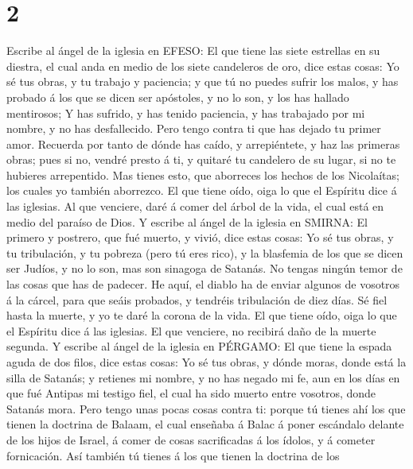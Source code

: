 \hypertarget{section-1}{%
\section{2}\label{section-1}}

 Escribe al ángel de la iglesia en EFESO: El que tiene las
siete estrellas en su diestra, el cual anda en medio de los siete
candeleros de oro, dice estas cosas:  Yo sé tus obras, y tu
trabajo y paciencia; y que tú no puedes sufrir los malos, y has probado
á los que se dicen ser apóstoles, y no lo son, y los has hallado
mentirosos;  Y has sufrido, y has tenido paciencia, y has
trabajado por mi nombre, y no has desfallecido.  Pero tengo
contra ti que has dejado tu primer amor.  Recuerda por tanto
de dónde has caído, y arrepiéntete, y haz las primeras obras; pues si
no, vendré presto á ti, y quitaré tu candelero de su lugar, si no te
hubieres arrepentido.  Mas tienes esto, que aborreces los
hechos de los Nicolaítas; los cuales yo también aborrezco. 
El que tiene oído, oiga lo que el Espíritu dice á las iglesias. Al que
venciere, daré á comer del árbol de la vida, el cual está en medio del
paraíso de Dios.  Y escribe al ángel de la iglesia en
SMIRNA: El primero y postrero, que fué muerto, y vivió, dice estas
cosas:  Yo sé tus obras, y tu tribulación, y tu pobreza
(pero tú eres rico), y la blasfemia de los que se dicen ser Judíos, y no
lo son, mas son sinagoga de Satanás.  No tengas ningún
temor de las cosas que has de padecer. He aquí, el diablo ha de enviar
algunos de vosotros á la cárcel, para que seáis probados, y tendréis
tribulación de diez días. Sé fiel hasta la muerte, y yo te daré la
corona de la vida.  El que tiene oído, oiga lo que el
Espíritu dice á las iglesias. El que venciere, no recibirá daño de la
muerte segunda.  Y escribe al ángel de la iglesia en
PÉRGAMO: El que tiene la espada aguda de dos filos, dice estas cosas:
 Yo sé tus obras, y dónde moras, donde está la silla de
Satanás; y retienes mi nombre, y no has negado mi fe, aun en los días en
que fué Antipas mi testigo fiel, el cual ha sido muerto entre vosotros,
donde Satanás mora.  Pero tengo unas pocas cosas contra ti:
porque tú tienes ahí los que tienen la doctrina de Balaam, el cual
enseñaba á Balac á poner escándalo delante de los hijos de Israel, á
comer de cosas sacrificadas á los ídolos, y á cometer fornicación.
 Así también tú tienes á los que tienen la doctrina de los
